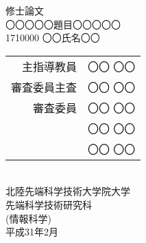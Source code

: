 \pagestyle{empty}
\begin{center}
修士論文 \\
\vspace{80pt}
〇〇〇〇〇題目〇〇〇〇〇\\
\vspace{80pt}
1710000 %
\quad
〇〇氏名〇〇\\
\vspace{100pt}
\begin{tabular}{rl}
主指導教員 & 〇〇 〇〇\\
審査委員主査 & 〇〇 〇〇\\
審査委員 & 〇〇 〇〇\\
& 〇〇 〇〇\\
& 〇〇 〇〇
\end{tabular}\\
\vspace{90pt}
北陸先端科学技術大学院大学\\
先端科学技術研究科\\ %
(情報科学)\\ %
\vspace{90pt}
平成31年2月\\ %
\end{center}
\cleardoublepage